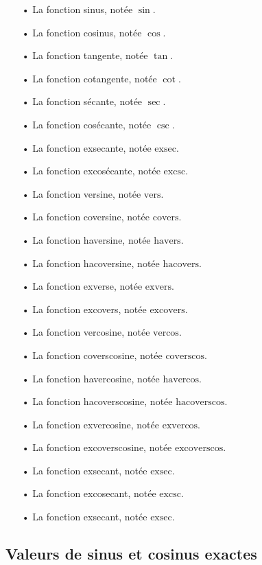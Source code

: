 \documentclass[a4paper]{article}
\begin{document}
		\begin{itemize}
				\item [•] La fonction sinus, notée $\sin$.
				\item [•] La fonction cosinus, notée $\cos$.
				\item [•] La fonction tangente, notée $\tan$.
				\item [•] La fonction cotangente, notée $\cot$.
				\item [•] La fonction sécante, notée $\sec$.
				\item [•] La fonction cosécante, notée $\csc$.
				\item [•] La fonction exsecante, notée $\text{exsec}$.
				\item [•] La fonction excosécante, notée $\text{excsc}$.
				\item [•] La fonction versine, notée $\text{vers}$.
				\item [•] La fonction coversine, notée $\text{covers}$.
				\item [•] La fonction haversine, notée $\text{havers}$.
				\item [•] La fonction hacoversine, notée $\text{hacovers}$.
				\item [•] La fonction exverse, notée $\text{exvers}$.
				\item [•] La fonction excovers, notée $\text{excovers}$.
				\item [•] La fonction vercosine, notée $\text{vercos}$.
				\item [•] La fonction coverscosine, notée $\text{coverscos}$.
				\item [•] La fonction havercosine, notée $\text{havercos}$.
				\item [•] La fonction hacoverscosine, notée $\text{hacoverscos}$.
				\item [•] La fonction exvercosine, notée $\text{exvercos}$.
				\item [•] La fonction excoverscosine, notée $\text{excoverscos}$.
				\item [•] La fonction exsecant, notée $\text{exsec}$.
				\item [•] La fonction excosecant, notée $\text{excsc}$.
				\item [•] La fonction exsecant, notée $\text{exsec}$.
			\end{itemize}

		\subsection*{Valeurs de sinus et cosinus exactes} \label{valeur_remarquable_trigo}
\end{document}
